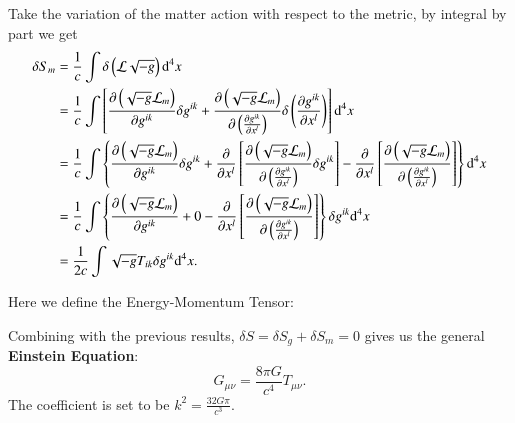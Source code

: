 \documentclass[openany,10pt]{book}
\theoremstyle{definition}
\theoremstyle{definition}
\theoremstyle{remark}
\begin{document}
Take the variation of the matter action with respect to the metric, by integral by part we get
\begin{equation}\begin{aligned}
    \delta S_m 
    &=\frac1c\int\delta\left(\mathcal{L} \sqrt{-g}\right){\rm d}^4x\\
    &=\frac1c\int\left[\frac{\partial\left(\sqrt{-g}\mathcal{L}_m\right)}{\partial g^{ik}}\delta g^{ik}+\frac{\partial\left(\sqrt{-g}\mathcal{L}_m\right)}{\partial\left(\frac{\partial g^{ik}}{\partial x^l}\right)}\delta \left(\frac{\partial g^{ik}}{\partial x^l}\right)\right]{\rm d}^4x\\
    &=\frac1c\int\left\{\frac{\partial\left(\sqrt{-g}\mathcal{L}_m\right)}{\partial g^{ik}}\delta g^{ik}+\frac{\partial}{\partial x^l}\left[\frac{\partial\left(\sqrt{-g}\mathcal{L}_m\right)}{\partial\left(\frac{\partial g^{ik}}{\partial x^l}\right)}\delta g^{ik}\right]- \frac{\partial}{\partial x^l}\left[\frac{\partial\left(\sqrt{-g}\mathcal{L}_m\right)}{\partial\left(\frac{\partial g^{ik}}{\partial x^l}\right)}\right]\right\}{\rm d}^4x\\
    &=\frac1c\int\left\{\frac{\partial\left(\sqrt{-g}\mathcal{L}_m\right)}{\partial g^{ik}}+0-    \frac{\partial}{\partial x^l}\left[\frac{\partial\left(\sqrt{-g}\mathcal{L}_m\right)}{\partial\left(\frac{\partial g^{ik}}{\partial x^l}\right)}\right]\right\}\delta g^{ik}{\rm d}^4x\\
    &=\frac{1}{2c}\int\sqrt{-g}T_{ik}\delta g^{ik}{\rm d}^4x.
\end{aligned}
\end{equation} %

Here we define the Energy-Momentum Tensor:
\label{emt}


Combining with the previous results, $\delta S=\delta S_g +\delta S_m=0$ gives us the general \textbf{Einstein Equation}:
\begin{equation}
    \boxed{G_{\mu\nu}=\frac{8\pi G}{c^4}T_{\mu\nu}.}
\end{equation}
The coefficient is set to be $k^2=\frac{32G\pi}{c^3}$. %
\end{document}
